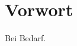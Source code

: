 \documentclass[Bachelorarbeit.tex]{subfiles}
\begin{document}
\chapter*{Vorwort}
Bei Bedarf.
\end{document}
